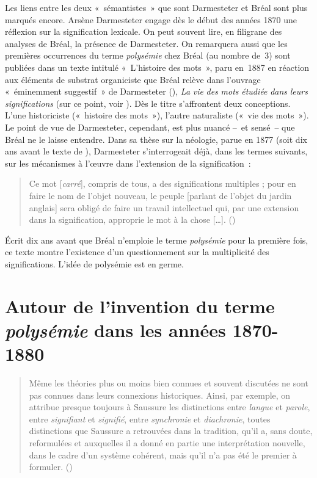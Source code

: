 \documentclass[output=paper]{langsci/langscibook}
\begin{document}
Les liens entre les deux «~sémantistes~» que sont Darmesteter et Bréal sont plus marqués encore. Arsène Darmesteter engage dès le début des années 1870 une réflexion sur la signification lexicale. On peut souvent lire, en filigrane des analyses de Bréal, la présence de Darmesteter. On remarquera aussi que les premières occurrences du terme \textit{polysémie} chez Bréal (au nombre de~3) sont publiées dans un texte intitulé «~L’histoire des mots~», paru en~1887 en réaction aux éléments de substrat organiciste que Bréal relève dans l’ouvrage «~éminemment suggestif~» de Darmesteter (\citealt[469]{meyer_arsene_1888}), \textit{La} \textit{vie} \textit{des} \textit{mots} \textit{étudiée} \textit{dans} \textit{leurs} \textit{significations} (sur ce point, voir \citealt{delesalle_vie_1987}). Dès le titre s’affrontent deux conceptions. L’une historiciste («~histoire des mots~»), l’autre naturaliste («~vie des mots~»). Le point de vue de Darmesteter, cependant, est plus nuancé –~et sensé~– que Bréal ne le laisse entendre. Dans sa thèse sur la néologie, parue en 1877 (soit dix ans avant le texte de \citeauthor{breal_lhistoire_1887}), Darmesteter s’interrogeait déjà, dans les termes suivants, sur les mécanismes à l’œuvre dans l’extension de la signification~:

\begin{quote}
Ce mot [\textit{carré}], compris de tous, a des significations multiples ; pour en faire le nom de l’objet nouveau, le peuple [parlant de l’objet du jardin anglais] sera obligé de faire un travail intellectuel qui, par une extension dans la signification, approprie le mot à la chose […]. (\citealt[33]{darmesteter_creation_1877})
\end{quote}

Écrit dix ans avant que Bréal n’emploie le terme \textit{polysémie} pour la première fois, ce texte montre l’existence d’un questionnement sur la multiplicité des significations. L’idée de polysémie est en germe.

\section{Autour de l’invention du terme \textit{polysémie} dans les années 1870-1880}

\begin{quote}
    \begin{small}
        
Même les théories plus ou moins bien connues et souvent discutées ne sont pas connues dans leurs connexions historiques. Ainsi, par exemple, on attribue presque toujours à Saussure les distinctions entre \textit{langue} et \textit{parole}, entre \textit{signifiant} et \textit{signifié}, entre \textit{synchronie} et \textit{diachronie}, toutes distinctions que Saussure a retrouvées dans la tradition, qu’il a, sans doute, reformulées et auxquelles il a donné en partie une interprétation nouvelle, dans le cadre d’un système cohérent, mais qu’il n’a pas été le premier à formuler. (\citealt[74]{coseriu_georg_1967})
    \end{small}
\end{quote}
\end{document}
